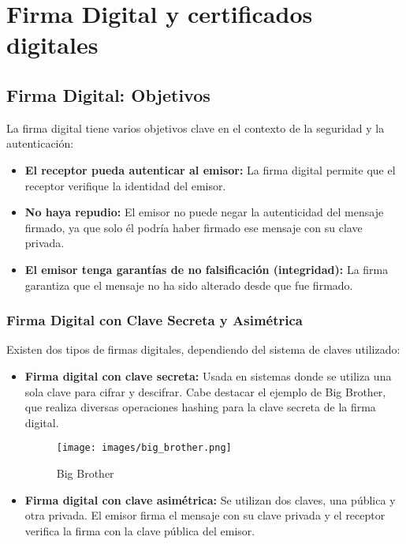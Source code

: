 \documentclass[a4paper,12pt]{article}
\begin{document}
\section{Firma Digital y certificados digitales}

\subsection{Firma Digital: Objetivos}

La firma digital tiene varios objetivos clave en el contexto de la seguridad y la autenticación:

\begin{itemize}
    \item \textbf{El receptor pueda autenticar al emisor:} La firma digital permite que el receptor verifique la identidad del emisor.
    \item \textbf{No haya repudio:} El emisor no puede negar la autenticidad del mensaje firmado, ya que solo él podría haber firmado ese mensaje con su clave privada.
    \item \textbf{El emisor tenga garantías de no falsificación (integridad):} La firma garantiza que el mensaje no ha sido alterado desde que fue firmado.
\end{itemize}

\subsubsection{Firma Digital con Clave Secreta y Asimétrica}

Existen dos tipos de firmas digitales, dependiendo del sistema de claves utilizado:

\begin{itemize}
    \item \textbf{Firma digital con clave secreta:} Usada en sistemas donde se utiliza una sola clave para cifrar y descifrar.
    Cabe destacar el ejemplo de Big Brother, que realiza diversas operaciones hashing para la clave secreta de la firma digital.
    \begin{figure}[H]
        \centering
        \texttt{[image: images/big\_brother.png]}
        \caption{Big Brother}
    \end{figure}
    \item \textbf{Firma digital con clave asimétrica:} Se utilizan dos claves, una pública y otra privada. El emisor firma el mensaje con su clave privada y el receptor verifica la firma con la clave pública del emisor.
\end{itemize}
\end{document}
